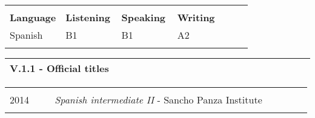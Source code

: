 \documentclass[11pt, letterpaper]{extarticle}
\begin{document}
	\begin{longtable}{C{0.234\linewidth}C{0.234\linewidth}C{0.234\linewidth}C{0.234\linewidth}N}
		                                                                            &                                                                             &                                                                             &                                                                             & \\[-0.25cm]
		\textbf{Language}                                                           & \textbf{Listening}                                                          & \textbf{Speaking}                                                           & \textbf{Writing}                                                            & \\[0.40cm]
		Spanish                                                                     & B1                                                                          & B1                                                                          & A2                                                                          & \\[0.40cm]
		                                                                            &                                                                             &                                                                             &                                                                             & \\[-0.25cm] \hline
	\end{longtable}


	\label{sec:V.1.1.}
	\begin{longtable}{L{1.012\linewidth}N}
		\textbf{\large V.1.1 - Official titles} & \\[0.60cm] \hline
	\end{longtable}

	\begin{longtable}{C{0.154\linewidth}C{0.834\linewidth}N}
		                                                             &                                                                                                                                                                                                                                                  & \\[-0.12cm]
		2014                                                         & \textit{Spanish intermediate II} - Sancho Panza Institute                                                                                                                                                                                        & \\[0.40cm]
		                                                             &                                                                                                                                                                                                                                                  & \\[-0.12cm] \hline
	\end{longtable}
\end{document}
